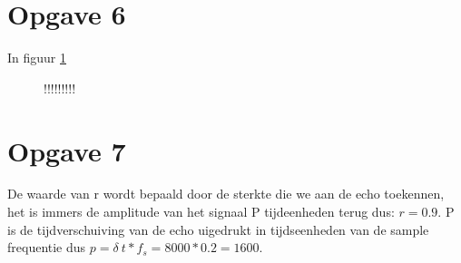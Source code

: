 \documentclass{article}
\begin{document}
\section{Opgave 6}
In figuur \ref{fig:opgave6}
\begin{figure}[h]
  \centering
  \caption{!!!!!!!!!}
  \label{fig:opgave6}
\end{figure}

\section{Opgave 7}
De waarde van r wordt bepaald door de sterkte die we aan de echo toekennen, het is immers de amplitude van het signaal P tijdeenheden terug dus: $r = 0.9$. P is de tijdverschuiving van de echo uigedrukt in tijdseenheden van de sample frequentie dus $p = \delta~t*f_s = 8000 * 0.2 = 1600$.
\end{document}
